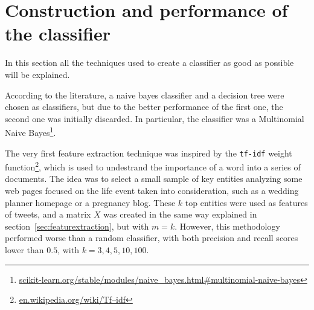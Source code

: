 \section{Construction and performance of the classifier}
In this section all the techniques used to create a classifier as good as possible will be explained.

 According to the literature, a naive bayes classifier and a decision tree were chosen as classifiers, but due to the better performance of the first one, the second one was initially discarded. In particular, the classifier was a Multinomial Naive Bayes\footnote{\url{scikit-learn.org/stable/modules/naive_bayes.html#multinomial-naive-bayes}}.

The very first feature extraction technique was inspired by the \texttt{tf-idf} weight function\footnote{\url{en.wikipedia.org/wiki/Tf–idf}}, which is used to undestrand the importance of a word into a series of documents. The idea was to select a small sample of key entities analyzing some web pages focused on the life event taken into consideration, such as a wedding planner homepage or a pregnancy blog. These $k$ top entities were used as features of tweets, and a matrix $X$ was created in the same way explained in section~\ref{sec:featurextraction}, but with $m = k$. However, this methodology performed worse than a random classifier, with both precision and recall scores lower than $0.5$, with $k = 3, 4, 5, 10, 100$.

\begin{table}[htbp]
\centering
{}\qquad\qquad
{}
\caption{The performance of the naive bayes were satisfactory on a very balanced dataset. Unfortunatly, users' timelines are very unbalanced, and this classifier turned out to be inappropriate.}
\end{table}

